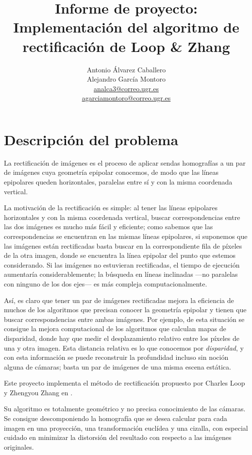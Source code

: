 \documentclass[a4paper, 11pt]{article}
\title{Informe de proyecto: \\ Implementación del algoritmo de rectificación de Loop \& Zhang}
\author{Antonio Álvarez Caballero \\ Alejandro García Montoro \\
\href{mailto:analca3@correo.ugr.es}{analca3@correo.ugr.es} \\
\href{mailto:agarciamontoro@correo.ugr.es}{agarciamontoro@correo.ugr.es}}
\date{}
\theoremstyle{definition}
\begin{document}
    \maketitle

    \section{Descripción del problema}

    La rectificación de imágenes es el proceso de aplicar sendas homografías a un par de imágenes cuya geometría epipolar conocemos, de modo que las líneas epipolares queden horizontales, paralelas entre sí y con la misma coordenada vertical.

    La motivación de la rectificación es simple: al tener las líneas epipolares horizontales y con la misma coordenada vertical, buscar correspondencias entre las dos imágenes es mucho más fácil y eficiente; como sabemos que las correspondencias se encuentran en las mismas líneas epipolares, si suponemos que las imágenes están rectificadas basta buscar en la correspondiente fila de píxeles de la otra imagen, donde se encuentra la línea epipolar del punto que estemos considerando. Si las imágenes no estuvieran rectificadas, el tiempo de ejecución aumentaría considerablemente; la búsqueda en líneas inclinadas ---no paralelas con ninguno de los dos ejes--- es más compleja computacionalmente.

    Así, es claro que tener un par de imágenes rectificadas mejora la eficiencia de muchos de los algoritmos que precisan conocer la geometría epipolar y tienen que buscar correspondencias entre ambas imágenes. Por ejemplo, de esta situación se consigue la mejora computacional de los algoritmos que calculan mapas de disparidad, donde hay que medir el desplazamiento relativo entre los píxeles de una y otra imagen. Esta distancia relativa es lo que conocemos por \emph{disparidad}, y con esta información se puede reconstruir la profundidad incluso sin noción alguna de cámaras; basta un par de imágenes de una misma escena estática.

    Este proyecto implementa el método de rectificación propuesto por Charles Loop y Zhengyou Zhang en \cite{LoopZhang}.

    Su algoritmo es totalmente geométrico y no precisa conocimiento de las cámaras.
    Se consigue descomponiendo la homografía que se desea calcular para cada imagen en una proyección, una transformación euclídea y una cizalla, con especial cuidado en minimizar la distorsión del resultado con respecto a las imágenes originales.
\end{document}
